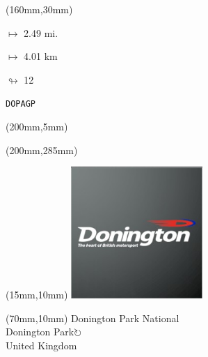 \begin{textblock*}{40mm}(160mm,30mm)%
\Large
\par$\mapsto$ 2.49 mi.
\par$\mapsto$ 4.01 km
\par$\looparrowright$ 12
\par\hfill\tiny\tt DOPAGP\\
\end{textblock*}
\begin{textblock*}{20mm}(200mm,5mm)%
\fbox{\thepage}
\label{DOPAGP}
\end{textblock*}
\begin{textblock*}{20mm}(200mm,285mm)%
\fbox{\thepage}
\end{textblock*}

\null\newpage
\begin{textblock*}{50mm}(15mm,10mm)%
\includegraphics[width=50mm]{LG/2015-05-20_00080.png}
\end{textblock*}
\begin{textblock*}{130mm}(70mm,10mm)%
{\fontsize{20}{20}\selectfont Donington Park National\\}
{\fontsize{16}{16}\selectfont Donington Park\hfill \Large$\circlearrowright$\\}
{\fontsize{12}{12}\selectfont United Kingdom\\}
\end{textblock*}
